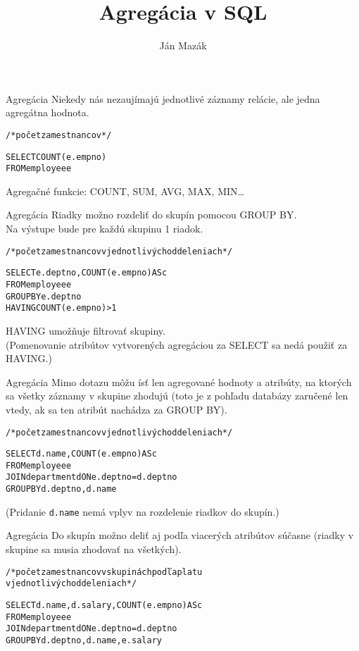 \documentclass[12pt]{beamer}
\title{Agregácia v SQL}
\author{Ján Mazák}
\institute{FMFI UK Bratislava}
\date{}
\def\blue#1{\textcolor{Cerulean}{#1}}
\begin{document}
\frame{\titlepage}



\begin{frame}[fragile]{Agregácia}
Niekedy nás nezaujímajú jednotlivé záznamy relácie, ale jedna agregátna hodnota.
\begin{alltt}
/* počet zamestnancov */

SELECT \alert{COUNT}(e.empno)
FROM employee e
\end{alltt}
Agregačné funkcie: COUNT, SUM, AVG, MAX, MIN\dots
\end{frame}

\begin{frame}[fragile]{Agregácia}
Riadky možno rozdeliť do skupín pomocou \alert{GROUP BY}.\\
Na výstupe bude pre každú skupinu 1 riadok.
\begin{alltt}
/* počet zamestnancov v jednotlivých oddeleniach */

SELECT e.deptno, \alert{COUNT}(e.empno) AS c
FROM employee e
\alert{GROUP BY} e.deptno
\blue{HAVING} COUNT(e.empno) > 1
\end{alltt}
\bigskip
\blue{HAVING} umožňuje filtrovať skupiny.\\
(Pomenovanie atribútov vytvorených agregáciou za SELECT sa nedá použiť za \blue{HAVING}.)
\end{frame}

\begin{frame}[fragile]{Agregácia}
Mimo dotazu môžu ísť len agregované hodnoty a atribúty, na ktorých sa všetky záznamy v skupine zhodujú
(toto je z pohľadu databázy zaručené len vtedy, ak sa ten atribút nachádza za GROUP BY).
\begin{alltt}
/* počet zamestnancov v jednotlivých oddeleniach */

SELECT \blue{d.name}, \alert{COUNT}(e.empno) AS c
FROM employee e
    JOIN department d ON e.deptno = d.deptno
\alert{GROUP BY} d.deptno, \blue{d.name}
\end{alltt}
(Pridanie \verb|d.name| nemá vplyv na rozdelenie riadkov do skupín.)
\end{frame}

\begin{frame}[fragile]{Agregácia}
Do skupín možno deliť aj podľa viacerých atribútov súčasne (riadky v skupine sa musia zhodovať na všetkých).
\begin{alltt}
/* počet zamestnancov v skupinách podľa platu
v jednotlivých oddeleniach */

SELECT d.name, d.salary, \alert{COUNT}(e.empno) AS c
FROM employee e
    JOIN department d ON e.deptno = d.deptno
\alert{GROUP BY} d.deptno, d.name, e.salary
\end{alltt}
\end{frame}
\end{document}
